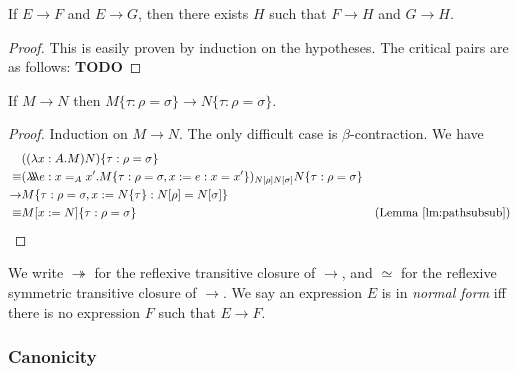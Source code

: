 \documentclass[a4paper,UKenglish]{lipics-v2016}
\newcommand*{\triplelambda}{\ensuremath{\lambda \!\! \lambda \!\! \lambda}}
\theoremstyle{plain}
\theoremstyle{definition}
\begin{document}
\begin{lemma}
\label{lm:diamond}
If $E \rightarrow F$ and $E \rightarrow G$, then there exists $H$ such that $F \rightarrow H$ and $G \rightarrow H$.
\end{lemma}

\begin{proof}
This is easily proven by induction on the hypotheses.  The critical pairs are as follows: \textbf{TODO}
\end{proof}

\begin{lemma}
\label{lm:resp-sub}
If $M \rightarrow N$ then $M \{ \tau : \rho = \sigma \} \rightarrow N \{ \tau : \rho = \sigma \}$.
\end{lemma}

\begin{proof}
Induction on $M \rightarrow N$.  The only difficult case is $\beta$-contraction.  We have
\begin{align*}
& ((\lambda x:A.M)N)\{ \tau : \rho = \sigma \} \\
\equiv & (\triplelambda e : x =_A x' . M \{ \tau : \rho = \sigma, x := e : x = x' \})_{N [ \rho ] N [ \sigma ]} N \{ \tau : \rho = \sigma \} \\
\rightarrow & M \{ \tau : \rho = \sigma, x := N \{ \tau \} : N [ \rho ] = N [ \sigma ] \} \\
\equiv & M [ x := N ] \{ \tau : \rho = \sigma \} & (\text{Lemma \ref{lm:pathsubsub}})
\end{align*}
\end{proof}

We write $\twoheadrightarrow$ for the reflexive transitive closure of $\rightarrow$, and $\simeq$ for the reflexive symmetric transitive closure of $\rightarrow$.
We say an expression $E$ is in \emph{normal form} iff there is no expression $F$ such that $E \rightarrow F$.

\subsubsection{Canonicity}
\end{document}
